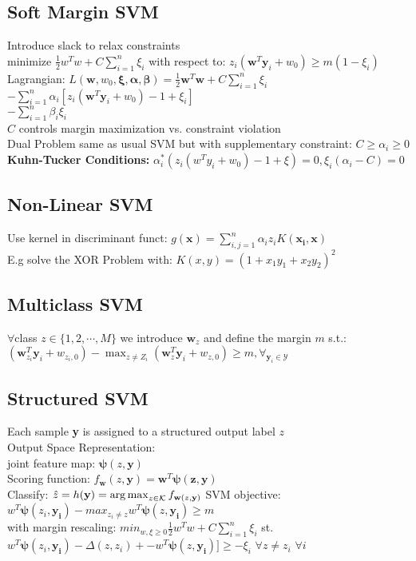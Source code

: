 \subsection*{Soft Margin SVM}
Introduce slack to relax constraints\\
minimize $\frac{1}{2}w^Tw + C\sum_{i=1}^n \xi_i$ with respect to: 
$z_i(\mathbf{w}^T\mathbf{y}_i+w_0)\geq m(1-\xi_i)$\\
Lagrangian: $L(\mathbf{w}, w_0,\mathbf{\xi}, \mathbf{\alpha}, \mathbf{\beta}) {=}\frac{1}{2}\mathbf{w}^T\mathbf{w}+C\sum_{i=1}^n\xi_i$
${-}\sum_{i=1}^n\alpha_i[z_i(\mathbf{w}^T\mathbf{y}_i{+}w_0){-}1{+}\xi_i]$\\
${-}\sum_{i=1}^n\beta_i\xi_i$\\
$C$ controls margin maximization vs. constraint violation\\
Dual Problem same as usual SVM but with supplementary constraint:
$C \geq \alpha_i \geq 0$
\textbf{Kuhn-Tucker Conditions:} 
$\alpha_i^*(z_i(w^Ty_i+w_0)-1 + \xi)= 0, \xi_i(\alpha_i-C) = 0$
\subsection*{Non-Linear SVM}
Use kernel in discriminant funct: $g(\mathbf{x})=\sum_{i,j=1}^n\alpha_iz_iK(\mathbf{x_i},\mathbf{x})$\\
E.g solve the XOR Problem with:
$K(x,y)=(1+x_1y_1+x_2y_2)^2$

\subsection*{Multiclass SVM}
$\forall$class $z\in\{1,2,\cdots,M\}$ we introduce $\mathbf{w}_z$ and define the margin $m$ s.t.:\\
$(\mathbf{w}_{z_i}^T\mathbf{y}_i+w_{z_i,0})-\max_{z\not=Z_i}(\mathbf{w}_z^T\mathbf{y}_i+w_{z,0})\geq m, \forall_{\mathbf{y}_i\in \mathcal{Y}}$

\subsection*{Structured SVM}
Each sample \textbf{y} is assigned to a structured output label $z$\\
Output Space Representation:\\
joint feature map: $\mathbf{\psi}(z,\mathbf{y})$\\
Scoring function: $f_{\mathbf{w}}(z,\mathbf{y})=\mathbf{w}^T\mathbf{\psi(z, \mathbf{y})}$\\
Classify: $\hat{z}=h(\mathbf{y})=\operatorname*{arg\,max}_{z\in\mathcal{K}}f_{\mathbf{w}(z, \mathbf{y})}$
SVM objective:  $w^T\mathbf{\psi}(z_i,\mathbf{y_i})-max_{z_i \neq z}w^T\mathbf{\psi}(z,\mathbf{y_i}) \geq m$ \\
with margin rescaling: $min_{w, \xi \geq 0} \frac{1}{2}w^Tw + C \sum_{i=1}^n \xi_i$ st. $w^T\mathbf{\psi}(z_i,\mathbf{y_i})-\Delta(z,z_i)+
-w^T\mathbf{\psi}(z,\mathbf{y_i})] \geq - \xi_i$ $\forall z \neq z_i$ $\forall i$


